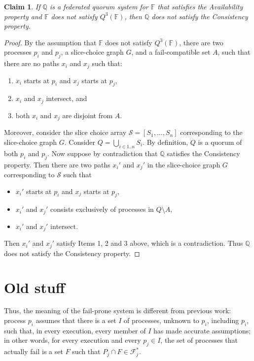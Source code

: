 \documentclass[11pt]{article}
\newtheorem{claim}{Claim}
\begin{document}
\begin{claim}
  If $\mathbb{Q}$ is a federated quorum system for $\mathbb{F}$ that satisfies the Availability property and $\mathbb{F}$ does not satisfy $Q^3(\mathbb{F})$, then $\mathbb{Q}$ does not satisfy the Consistency property.
\end{claim}
\begin{proof}
  By the assumption that $\mathbb{F}$ does not satisfy $Q^3(\mathbb{F})$, there are two processes $p_i$ and $p_j$, a slice-choice graph $G$, and a fail-compatible set $A$, such that there are no paths $x_i$ and $x_j$ such that:
  \begin{enumerate}
    \item $x_i$ starts at $p_i$ and $x_j$ starts at $p_j$,
    \item $x_i$ and $x_j$ intersect, and
    \item both $x_i$ and $x_j$ are disjoint from $A$.
  \end{enumerate}
  Moreover, consider the slice choice array $\mathcal{S}=\left[S_1,...,S_n\right]$ corresponding to the slice-choice graph $G$.
  Consider $Q=\bigcup_{i\in 1..n}S_i$. By definition, $Q$ is a quorum of both $p_i$ and $p_j$.
  Now suppose by contradiction that $\mathbb{Q}$ satisfies the Consistency property. Then there are two paths $x_i'$ and $x_j'$ in the slice-choice graph $G$ corresponding to $\mathcal{S}$ such that
  \begin{itemize}
    \item $x_i'$ starts at $p_i$ and $x_j$ starts at $p_j$,
    \item $x_i'$ and $x_j'$ consists exclusively of processes in $Q\setminus A$,
    \item $x_i'$ and $x_j'$ intersect.
  \end{itemize}
  Then $x_i'$ and $x_j'$ satisfy Items 1, 2 and 3 above, which is a contradiction. Thus $\mathbb{Q}$ does not satisfy the Consistency property.
\end{proof}

\section{Old stuff}


Thus, the meaning of the fail-prone system is different from previous work: process $p_i$ assumes that there is a set $I$ of processes, unknown to $p_i$, including $p_i$, such that, in every execution, every member of $I$ has made accurate assumptions; in other words, for every execution and every $p_j\in I$, the set of processes that actually fail is a set $F$ such that $P_j\cap F \in \mathcal{F}_j^*$.
\end{document}
